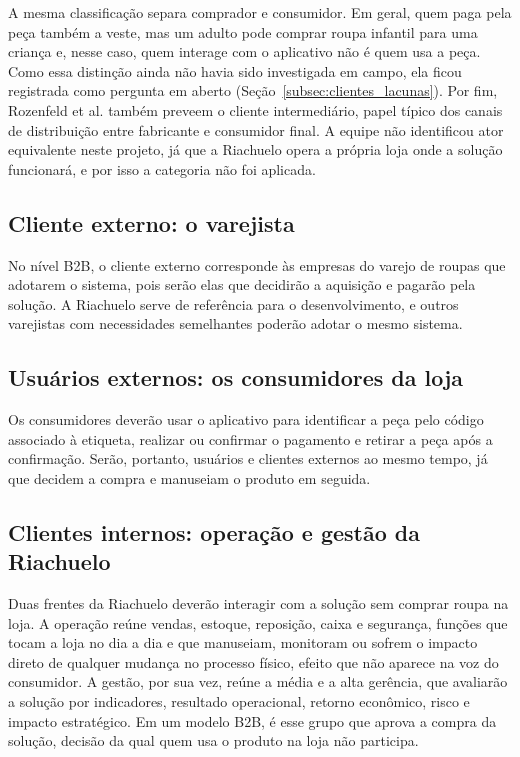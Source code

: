 A mesma classificação separa comprador e consumidor. Em geral, quem paga pela peça também a veste, mas um adulto pode comprar roupa infantil para uma criança e, nesse caso, quem interage com o aplicativo não é quem usa a peça. Como essa distinção ainda não havia sido investigada em campo, ela ficou registrada como pergunta em aberto (Seção~\ref{subsec:clientes_lacunas}). Por fim, Rozenfeld et al. também preveem o cliente intermediário, papel típico dos canais de distribuição entre fabricante e consumidor final. A equipe não identificou ator equivalente neste projeto, já que a Riachuelo opera a própria loja onde a solução funcionará, e por isso a categoria não foi aplicada.

\subsection{Cliente externo: o varejista}
\label{subsec:cliente_externo}

No nível B2B, o cliente externo corresponde às empresas do varejo de roupas que adotarem o sistema, pois serão elas que decidirão a aquisição e pagarão pela solução. A Riachuelo serve de referência para o desenvolvimento, e outros varejistas com necessidades semelhantes poderão adotar o mesmo sistema.

\subsection{Usuários externos: os consumidores da loja}
\label{subsec:usuarios_externos}

Os consumidores deverão usar o aplicativo para identificar a peça pelo código associado à etiqueta, realizar ou confirmar o pagamento e retirar a peça após a confirmação. Serão, portanto, usuários e clientes externos ao mesmo tempo, já que decidem a compra e manuseiam o produto em seguida.

\subsection{Clientes internos: operação e gestão da Riachuelo}
\label{subsec:clientes_internos}

Duas frentes da Riachuelo deverão interagir com a solução sem comprar roupa na loja. A operação reúne vendas, estoque, reposição, caixa e segurança, funções que tocam a loja no dia a dia e que manuseiam, monitoram ou sofrem o impacto direto de qualquer mudança no processo físico, efeito que não aparece na voz do consumidor. A gestão, por sua vez, reúne a média e a alta gerência, que avaliarão a solução por indicadores, resultado operacional, retorno econômico, risco e impacto estratégico. Em um modelo B2B, é esse grupo que aprova a compra da solução, decisão da qual quem usa o produto na loja não participa.

